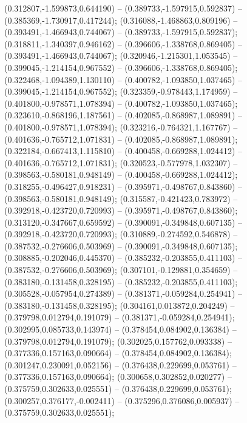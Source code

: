  (0.312807,-1.599873,0.644190) -- (0.389733,-1.597915,0.592837) -- (0.385369,-1.730917,0.417244);
 (0.316088,-1.468863,0.809196) -- (0.393491,-1.466943,0.744067) -- (0.389733,-1.597915,0.592837);
 (0.318811,-1.340397,0.946162) -- (0.396606,-1.338768,0.869405) -- (0.393491,-1.466943,0.744067);
 (0.320946,-1.215301,1.053545) -- (0.399045,-1.214154,0.967552) -- (0.396606,-1.338768,0.869405);
 (0.322468,-1.094389,1.130110) -- (0.400782,-1.093850,1.037465) -- (0.399045,-1.214154,0.967552);
 (0.323359,-0.978443,1.174959) -- (0.401800,-0.978571,1.078394) -- (0.400782,-1.093850,1.037465);
 (0.323610,-0.868196,1.187561) -- (0.402085,-0.868987,1.089891) -- (0.401800,-0.978571,1.078394);
 (0.323216,-0.764321,1.167767) -- (0.401636,-0.765712,1.071831) -- (0.402085,-0.868987,1.089891);
 (0.322184,-0.667413,1.115810) -- (0.400458,-0.669288,1.024412) -- (0.401636,-0.765712,1.071831);
 (0.320523,-0.577978,1.032307) -- (0.398563,-0.580181,0.948149) -- (0.400458,-0.669288,1.024412);
 (0.318255,-0.496427,0.918231) -- (0.395971,-0.498767,0.843860) -- (0.398563,-0.580181,0.948149);
 (0.315587,-0.421423,0.783972) -- (0.392918,-0.423720,0.720993) -- (0.395971,-0.498767,0.843860);
 (0.313120,-0.347667,0.659592) -- (0.390091,-0.349848,0.607135) -- (0.392918,-0.423720,0.720993);
 (0.310889,-0.274592,0.546878) -- (0.387532,-0.276606,0.503969) -- (0.390091,-0.349848,0.607135);
 (0.308885,-0.202046,0.445370) -- (0.385232,-0.203855,0.411103) -- (0.387532,-0.276606,0.503969);
 (0.307101,-0.129881,0.354659) -- (0.383180,-0.131458,0.328195) -- (0.385232,-0.203855,0.411103);
 (0.305528,-0.057954,0.274389) -- (0.381371,-0.059284,0.254941) -- (0.383180,-0.131458,0.328195);
 (0.304161,0.013872,0.204249) -- (0.379798,0.012794,0.191079) -- (0.381371,-0.059284,0.254941);
 (0.302995,0.085733,0.143974) -- (0.378454,0.084902,0.136384) -- (0.379798,0.012794,0.191079);
 (0.302025,0.157762,0.093338) -- (0.377336,0.157163,0.090664) -- (0.378454,0.084902,0.136384);
 (0.301247,0.230091,0.052156) -- (0.376438,0.229699,0.053761) -- (0.377336,0.157163,0.090664);
 (0.300658,0.302852,0.020277) -- (0.375759,0.302633,0.025551) -- (0.376438,0.229699,0.053761);
 (0.300257,0.376177,-0.002411) -- (0.375296,0.376086,0.005937) -- (0.375759,0.302633,0.025551);
